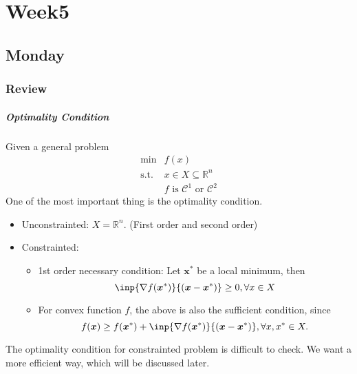 
\chapter{Week5}

\section{Monday}
\subsection{Review}
\paragraph{Optimality Condition}
Given a general problem
\[
\begin{array}{ll}
\min&f(x)\\
\mbox{s.t.}&x\in X\subseteq\mathbb{R}^n\\
&f\mbox{ is }\mathcal{C}^1\mbox{ or }\mathcal{C}^2
\end{array}
\]
One of the most important thing is the optimality condition.
\begin{itemize}
\item
Unconstrainted: $X=\mathbb{R}^n$. (First order and second order)
\item
Constrainted:
\begin{itemize}
\item
1st order necessary condition: Let $\bm x^*$ be a local minimum, then
\[
\inp{\nabla f(\bm x^*)}{(\bm x-\bm x^*)}\ge0,\forall x\in X
\]
\item
For convex function $f$, the above is also the sufficient condition, since
\[
f(\bm x)\ge f(\bm x^*)+\inp{\nabla f(\bm x^*)}{(\bm x-\bm x^*)},\forall x,x^*\in X.
\]
\end{itemize}
\end{itemize}

The optimality condition for constrainted problem is difficult to check. We want a more efficient way, which will be discussed later.
